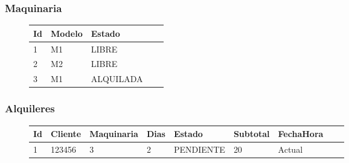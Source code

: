 \subsubsection{Maquinaria}
\begin{figure}[h]
\begin{center}
\begin{tabular}{l*{3}{l}l}
Id & Modelo & Estado \\
\hline
1 & M1 & LIBRE  \\
2 & M2 & LIBRE  \\
3 & M1 & ALQUILADA  \\
\end{tabular}
\end{center}
\end{figure}

\subsubsection{Alquileres}
\begin{figure}[h]
\begin{center}
\begin{tabular}{l*{7}{l}l}
Id & Cliente & Maquinaria & Dias & Estado & Subtotal & FechaHora\\
\hline
1 & 123456 & 3 & 2 & PENDIENTE & 20 & Actual  \\
\end{tabular}
\end{center}
\end{figure}